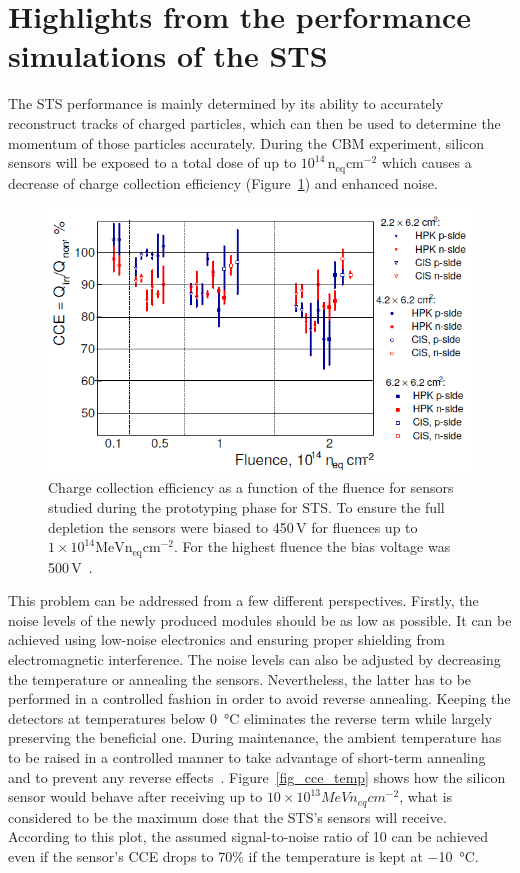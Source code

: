 \section{Highlights from the performance simulations of the STS}
The STS performance is mainly determined by its ability to accurately reconstruct tracks of charged particles, which can then be used to determine the momentum of those particles accurately. During the \gls{CBM} experiment, silicon sensors will be exposed to a total dose of up to $10^{14}\,\mathrm{n_{eq}cm^{-2}}$ which causes a decrease of charge collection efficiency (Figure~\ref{fig_cce}) and enhanced noise. 

\begin{figure}[!h]
\centering
\includegraphics[width=0.8\columnwidth]{Chapter2/images/CCE.png}
\caption{Charge collection efficiency as a function of the fluence for sensors studied during the prototyping phase for \gls{STS}. To ensure the full depletion the sensors were biased to 450\,V for fluences up to $1\times10^14\mathrm{MeV n_{eq}cm^{-2}}$. For the highest fluence the bias voltage was 500\,V~\cite{Momot:2019lnx}.}
\label{fig_cce}
\end{figure}

This problem can be addressed from a few different perspectives. Firstly, the noise levels of the newly produced modules should be as low as possible. It can be achieved using low-noise electronics and ensuring proper shielding from electromagnetic interference. The noise levels can also be adjusted by decreasing the temperature or annealing the sensors. Nevertheless, the latter has to be performed in a controlled fashion in order to avoid reverse annealing. Keeping the detectors at temperatures below \SI{0}{\celsius} eliminates the reverse term while largely preserving the beneficial one. During maintenance, the ambient temperature has to be raised in a controlled manner to take advantage of short-term annealing and to prevent any reverse effects~\cite{Hartmann:2017gzy}. Figure~\ref{fig_cce_temp} shows how the silicon sensor would behave after receiving up to $10\times10^{13} MeV n_{eq}cm^{-2}$, what is considered to be the maximum dose that the \gls{STS}'s sensors will receive. According to this plot, the assumed signal-to-noise ratio of 10 can be achieved even if the sensor's \gls{CCE} drops to 70\% if the temperature is kept at \SI{-10}{\celsius}.

